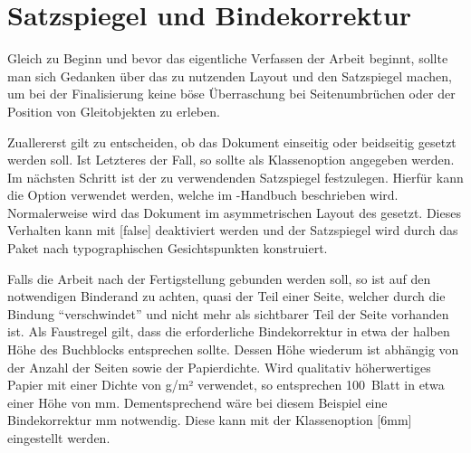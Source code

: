 \documentclass[%
  english,ngerman,%
  geometry=no,DIV=12,automark,%
]{tudscrartcl}
\begin{document}
\section{Satzspiegel und Bindekorrektur}
Gleich zu Beginn und bevor das eigentliche Verfassen der Arbeit beginnt, sollte 
man sich Gedanken über das zu nutzenden Layout und den Satzspiegel machen, um 
bei der Finalisierung keine böse Überraschung bei Seitenumbrüchen oder der 
Position von Gleitobjekten zu erleben.

Zuallererst gilt zu entscheiden, ob das Dokument einseitig oder beidseitig 
gesetzt werden soll. Ist Letzteres der Fall, so sollte  als 
Klassenoption angegeben werden. Im nächsten Schritt ist der zu verwendenden 
Satzspiegel festzulegen. Hierfür kann die Option  verwendet 
werden, welche im \TUDScript-Handbuch beschrieben wird. Normalerweise wird das 
Dokument im asymmetrischen Layout des \CDs gesetzt. Dieses Verhalten kann mit 
[false] deaktiviert werden und der Satzspiegel wird durch das 
Paket  nach typographischen Gesichtspunkten konstruiert.

Falls die Arbeit nach der Fertigstellung gebunden werden soll, so ist auf den 
notwendigen Binderand zu achten, quasi der Teil einer Seite, welcher durch die 
Bindung \enquote{verschwindet} und nicht mehr als sichtbarer Teil der Seite 
vorhanden ist. Als Faustregel gilt, dass die erforderliche Bindekorrektur in 
etwa der halben Höhe des Buchblocks entsprechen sollte. Dessen Höhe wiederum 
ist abhängig von der Anzahl der Seiten sowie der Papierdichte. Wird qualitativ 
höherwertiges Papier mit einer Dichte von \unit[100]{g/m²} verwendet, so 
entsprechen 100~Blatt in etwa einer Höhe von \unit[12]{mm}. Dementsprechend 
wäre bei diesem Beispiel eine Bindekorrektur \unit[6]{mm} notwendig. Diese 
kann mit der Klassenoption [6mm] eingestellt werden.
\end{document}

